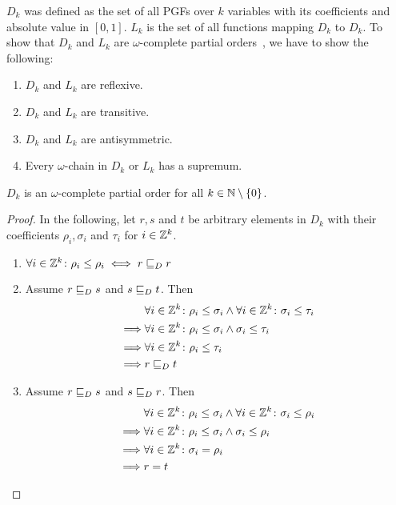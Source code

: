 $D_k$ was defined as the set of all PGFs over $k$ variables with its coefficients and absolute value in $[0,1]$.
$L_k$ is the set of all functions mapping $D_k$ to $D_k$.
To show that $D_k$ and $L_k$ are $\omega$-complete partial orders~\cite{winskel:cpos}, we have to show the following:
\begin{enumerate}
	\item $D_k$ and $L_k$ are reflexive.
	\item $D_k$ and $L_k$ are transitive.
	\item $D_k$ and $L_k$ are antisymmetric.
	\item Every $\omega$-chain in $D_k$ or $L_k$ has a supremum.
\end{enumerate}
\begin{lemma}[continues=lem:ext:cpos]
	$D_k$ is an $\omega$-complete partial order for all $k \in \mathbb{N} \setminus \{0\}$.
	\begin{proof}
		In the following, let $r, s$ and $t$ be arbitrary elements in $D_k$ with their coefficients $\rho_i, \sigma_i$ and $\tau_i$ for $i \in \mathbb{Z}^k$.
		\begin{enumerate}
			\item $\forall i \in \mathbb{Z}^k \colon \rho_i \leq \rho_i \iff r \sqsubseteq_{D} r$
			
			\item Assume $r \sqsubseteq_{D} s$ and $s \sqsubseteq_{D} t$.
			Then \begin{align*}
				& \forall i \in \mathbb{Z}^k \colon \rho_i \leq \sigma_i \land
					\forall i \in \mathbb{Z}^k \colon \sigma_i \leq \tau_i \\
				\implies & \forall i \in \mathbb{Z}^k \colon \rho_i \leq \sigma_i
					\land \sigma_i \leq \tau_i \\
				\implies & \forall i \in \mathbb{Z}^k \colon \rho_i \leq \tau_i \\
				\implies & r \sqsubseteq_{D} t
			\end{align*}
			
			\item Assume $r \sqsubseteq_{D} s$ and $s \sqsubseteq_{D} r$.
			Then \begin{align*}
				& \forall i \in \mathbb{Z}^k \colon \rho_i \leq \sigma_i \land
				\forall i \in \mathbb{Z}^k \colon \sigma_i \leq \rho_i \\
				\implies & \forall i \in \mathbb{Z}^k \colon \rho_i \leq \sigma_i
					\land \sigma_i \leq \rho_i \\
				\implies & \forall i \in \mathbb{Z}^k \colon \sigma_i = \rho_i \\
				\implies & r = t
			\end{align*}
			

\end{enumerate}
\end{proof}
\end{lemma}
